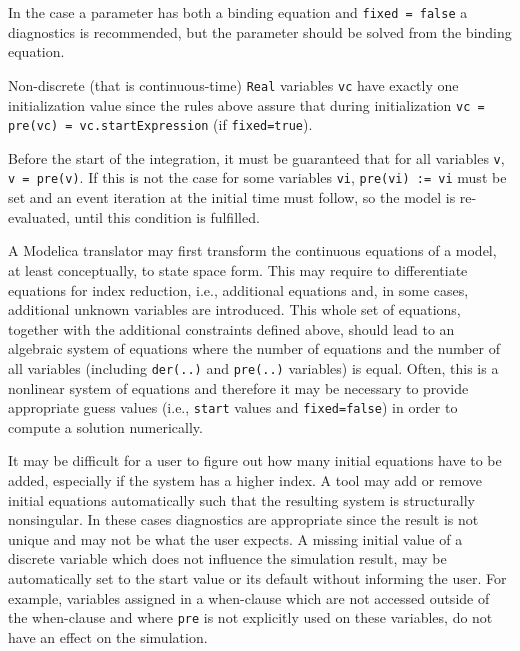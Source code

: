 \begin{nonnormative}
In the case a parameter has both a binding equation and \lstinline!fixed = false! a diagnostics is recommended, but the parameter should be solved from the binding equation.

Non-discrete (that is continuous-time) \lstinline!Real! variables \lstinline!vc! have exactly one initialization value since the rules above assure that during initialization
\lstinline!vc = pre(vc) = vc.startExpression! (if \lstinline!fixed=true!).

Before the start of the integration, it must be guaranteed that for all variables \lstinline!v!, \lstinline!v = pre(v)!. If this is not the case for some variables
\lstinline!vi!, \lstinline!pre(vi) := vi! must be set and an event iteration at the initial time must follow, so the model is re-evaluated, until this condition is fulfilled.

A Modelica translator may first transform the continuous equations of a model, at least conceptually, to state space form. This may require to differentiate equations for index
reduction, i.e., additional equations and, in some cases, additional unknown variables are introduced.  This whole set of equations, together with the additional constraints
defined above, should lead to an algebraic system of equations where the number of equations and the number of all variables (including \lstinline!der(..)! and \lstinline!pre(..)!
variables) is equal.  Often, this is a nonlinear system of equations and therefore it may be necessary to provide appropriate guess values (i.e., \lstinline!start! values and
\lstinline!fixed=false!) in order to compute a solution numerically.

It may be difficult for a user to figure out how many initial equations have to be added, especially if the system has a higher index. A tool may add or remove initial equations
automatically such that the resulting system is structurally nonsingular.  In these cases diagnostics are appropriate since the result is not unique and may not be what the user
expects.  A missing initial value of a discrete variable which does not influence the simulation result, may be automatically set to the start value or its default without
informing the user.  For example, variables assigned in a when-clause which are not accessed outside of the when-clause and where \lstinline!pre! is not explicitly
used on these variables, do not have an effect on the simulation.
\end{nonnormative}

